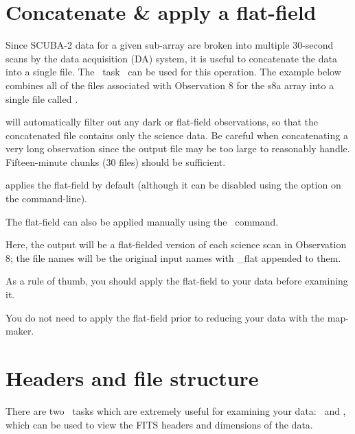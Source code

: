 \documentclass[11pt,oneside,chapters]{starlink}
\begin{document}
\section{Concatenate \& apply a flat-field}
\label{sec:concat}

Since SCUBA-2 data for a given sub-array are broken into multiple
30-second scans by the data acquisition (DA) system, it is useful to
concatenate the data into a single file. The \smurf\ task \concat\ can
be used for this operation. The example below combines all of the
files associated with Observation 8 for the s8a array into a single
file called .

\begin{terminalv}
\end{terminalv}

 will automatically filter out any dark or flat-field
observations, so that the concatenated file contains only the science
data. Be careful when concatenating a very long observation since the
output file may be too large to reasonably handle. Fifteen-minute
chunks (30 files) should be sufficient.

 applies the flat-field by default (although it can be
disabled using the  option on the command-line).

The flat-field can also be applied manually using the \flatfield\
command.

\begin{terminalv}
\end{terminalv}
Here, the output will be a flat-fielded version of each science scan
in Observation 8; the file names will be the original input
names with \_flat appended to them.

As a rule of thumb, you should apply the flat-field to your data
before examining it.


\begin{tip}
You do not need to apply the flat-field prior to reducing your
data with the map-maker.
\end{tip}

\section{Headers and file structure}
\label{sec:fitsheader}

There are two \Kappa\ tasks which are extremely useful for examining
your data: \fitslist\ and \ndftrace, which can be used to view the
FITS headers and dimensions of the data.
\end{document}
